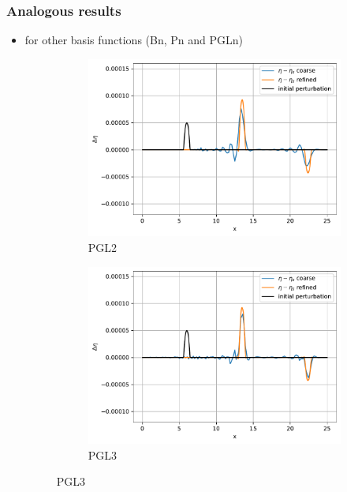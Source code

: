 \documentclass[pt12]{beamer}
\begin{document}
\begin{frame}
\frametitle{Analogous results}

\begin{itemize}

\item for other basis functions (Bn, Pn and PGLn)
\begin{figure}
     \centering
     \begin{subfigure}[b]{0.3\textwidth}
         \centering
         \includegraphics[width=\textwidth]{alb_bases_WBp3s14jrPGL2.pdf}
         \caption{PGL2}
     \end{subfigure}
     \begin{subfigure}[b]{0.3\textwidth}
         \centering
         \includegraphics[width=\textwidth]{alb_bases_WBp3s14jrPGL3.pdf}
         \caption{PGL3}
     \end{subfigure}

\end{figure}
\end{itemize}
\end{frame}
\end{document}
